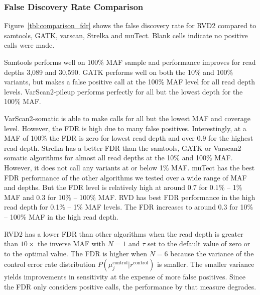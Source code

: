 \documentclass{bioinfo}
\begin{document}
\subsubsection*{False Discovery Rate Comparison}

Figure~\ref{tbl:comparison_fdr} shows the false discovery rate for RVD2 compared to samtools, GATK, varscan, Strelka and muTect. Blank cells indicate no positive calls were made.

Samtools performs well on 100\% MAF sample and performance improves for read depths 3,089 and 30,590. GATK performs well on both the 10\% and 100\% variants, but makes a false positive call at the 100\% MAF level for all read depth levels. VarScan2-pileup performs perfectly for all but the lowest depth for the 100\% MAF.

VarScan2-somatic is able to make calls for all but the lowest MAF and coverage level. However, the FDR is high due to many false positives. Interestingly, at a MAF of 100\% the FDR is zero for lowest read depth and over 0.9 for the highest read depth. Strelka has a better FDR than the samtools, GATK or Varscan2-somatic algorithms for almost all read depths at the 10\% and 100\% MAF. However, it does not call any variants at or below 1\% MAF.  muTect has the best FDR performance of the other algorithms we tested over a wide range of MAF and depths. But the FDR level is relatively high at around 0.7 for 0.1\% -- 1\% MAF and 0.3 for 10\% -- 100\% MAF. RVD has best FDR performance in the high read depth for 0.1\% -- 1\% MAF levels. The FDR increases to around 0.3 for 10\% -- 100\% MAF in the high read depth.

RVD2 has a lower FDR than other algorithms when the read depth is greater than $10\times$ the inverse MAF with $N=1$ and $\tau$ set to the default value of zero or to the optimal value. The FDR is higher when $N=6$ because the variance of the control error rate distribution $P(\mu_j^{\text{control}} | r^{\text{control}})$ is smaller. The smaller variance yields improvements in sensitivity at the expense of more false positives. Since the FDR only considers positive calls, the performance by that measure degrades.

\vspace{-10pt}
\end{document}
